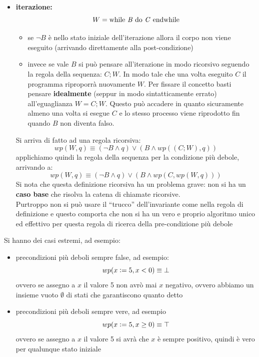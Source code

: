 \begin{itemize}
				      					\item \textbf{iterazione:} 
				      					      \[W=\mbox{while \textit{B} do \textit{C} endwhile}\]
				      					      
				      					      \begin{itemize}
				      					          \item se $\neg B$ è nello stato iniziale dell'iterazione allora il corpo
				      					      non viene eseguito (arrivando direttamente alla post-condizione)
				      					      
				      					      \item invece se
				      					      vale $B$ si può pensare all'iterazione in modo ricorsivo seguendo la regola della sequenza: $C;W$. In modo tale che una volta eseguito $C$ il programma riproporrà nuovamente $W$. Per fissare il concetto basti pensare \textbf{idealmente} (seppur in modo sintatticamente errato) all'eguaglianza $W=C;W$. Questo può accadere in 
				      					      quanto sicuramente almeno una volta si esegue $C$ e lo stesso processo viene riprodotto fin quando $B$ non diventa falso. 
				      					      \end{itemize}   
				      					      Si
				      					      arriva di fatto ad una regola ricorsiva:
				      					      \[wp(W, q)\equiv(\neg B\land q)\lor(B\land wp((C;W), q))\]
				      					      applichiamo quindi la regola della sequenza per la condizione più debole,
				      					      arrivando a:
				      					      \[wp(W, q)\equiv(\neg B\land q)\lor(B\land wp(C, wp(W, q)))\]
				      					      Si nota che questa definizione ricorsiva ha un problema grave: non si ha un
				      					      \textbf{caso base} che risolva la catena di chiamate ricorsive.\\
				      					      Purtroppo non si può usare il ``trucco'' dell'invariante come nella regola di
				      					      definizione e questo comporta che non si ha un vero e proprio algoritmo unico
				      					      ed effettivo per questa regola di ricerca della pre-condizione più debole
				      				\end{itemize}
				      				Si hanno dei casi estremi, ad esempio:
				      				\begin{itemize}
				      					\item precondizioni più deboli sempre false, ad esempio:
				      					      \[wp(x\cceq5, x<0)\equiv\bot\]
				      					      ovvero se assegno a $x$ il valore 5 non avrò mai $x$ negativo,
				      					      ovvero abbiamo un insieme vuoto $\emptyset$ di stati che garantiscono quanto detto
				      					\item precondizioni più deboli sempre vere, ad esempio
				      					      \[wp(x\cceq 5, x\geq0)\equiv\top\]
				      					      ovvero se assegno a $x$ il valore 5 si avrà che $x$ è sempre
				      					      positivo, quindi è vero per qualunque stato iniziale
				      				\end{itemize}
